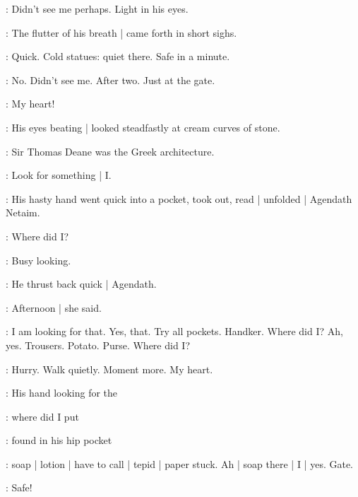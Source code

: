 \BloomInt:
Didn't see me perhaps.
Light in his eyes.

:
The flutter of his breath |
came forth in short sighs.

\BloomInt:
Quick.
Cold statues:
quiet there.
Safe in a minute.

\BloomInt:
No.
Didn't see me.
After two.
Just at the gate.

\BloomInt:
My heart!

:
His eyes beating |
looked steadfastly at cream curves of stone.

\BloomInt:
Sir Thomas Deane was the Greek architecture.


\BloomInt:
Look for something |
I.

:
His hasty hand went quick into a pocket,
took out,
read |
unfolded |
Agendath Netaim.

\BloomInt:
Where did I?

\BloomInt:
Busy looking.

:
He thrust back quick |
Agendath.

\BloomInt:
Afternoon |
she said.

\BloomInt:
I am looking for that.
Yes, that.
Try all pockets.
Handker.
Where did I?
Ah, yes.
Trousers.
Potato.
Purse.
Where did I?

\BloomInt:
Hurry.
Walk quietly.
Moment more.
My heart.

:
His hand looking for the

\BloomInt:
where did I put

:
found in his hip pocket

\BloomInt:
soap |
lotion |
have to call |
tepid |
paper stuck.
Ah |
soap there |
I |
yes.
Gate.

\BloomInt:
Safe!
